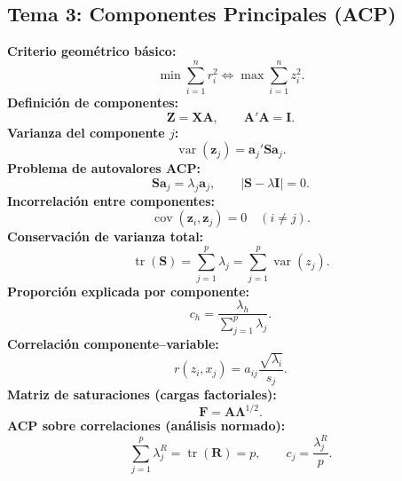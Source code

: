 \documentclass[12pt, a4paper]{article}
\theoremstyle{plain}
\theoremstyle{definition}
\theoremstyle{remark}
\newcommand{\mat}[1]{\mathbf{#1}}
\newcommand{\tr}{\operatorname{tr}}
\begin{document}
\subsection*{Tema 3: Componentes Principales (ACP)}
\begin{mdframed}[style=resultado]
\textbf{Criterio geométrico básico:}
\[
  \min\sum_{i=1}^n r_i^2 \Longleftrightarrow \max\sum_{i=1}^n z_i^2.
\]
\textbf{Definición de componentes:}
\[
  \mat{Z}=\mathbf{X}\mat{A},\qquad \mat{A}'\mat{A}=\mat{I}.
\]
\textbf{Varianza del componente $j$:}
\[
  \operatorname{var}(\mathbf{z}_j)=\mathbf{a}_j'\mat{S}\mathbf{a}_j.
\]
\textbf{Problema de autovalores ACP:}
\[
  \mat{S}\mathbf{a}_j=\lambda_j\mathbf{a}_j,\qquad
  |\mat{S}-\lambda\mat{I}|=0.
\]
\textbf{Incorrelación entre componentes:}
\[
  \operatorname{cov}(\mathbf{z}_i,\mathbf{z}_j)=0\quad (i\neq j).
\]
\textbf{Conservación de varianza total:}
\[
  \tr(\mat{S})=\sum_{j=1}^p\lambda_j=\sum_{j=1}^p\operatorname{var}(z_j).
\]
\textbf{Proporción explicada por componente:}
\[
  c_h=\frac{\lambda_h}{\sum_{j=1}^p\lambda_j}.
\]
\textbf{Correlación componente--variable:}
\[
  r(z_i,x_j)=a_{ij}\frac{\sqrt{\lambda_i}}{s_j}.
\]
\textbf{Matriz de saturaciones (cargas factoriales):}
\[
  \mat{F}=\mat{A}\boldsymbol{\Lambda}^{1/2}.
\]
\textbf{ACP sobre correlaciones (análisis normado):}
\[
  \sum_{j=1}^p \lambda_j^{R}=\tr(\mat{R})=p,\qquad
  c_j=\frac{\lambda_j^{R}}{p}.
\]
\end{mdframed}
\end{document}
